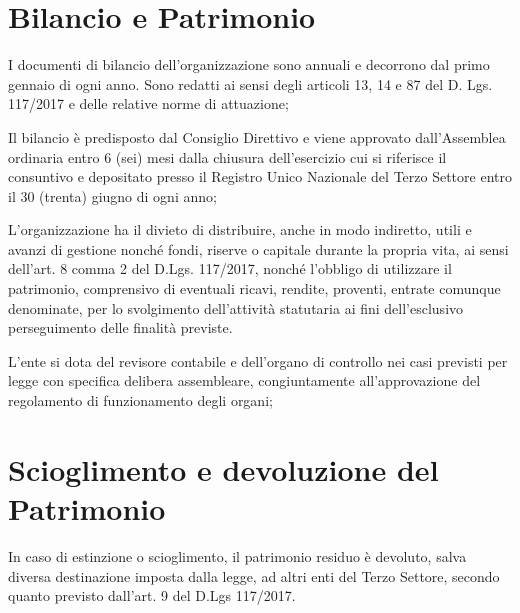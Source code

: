 \documentclass[legalpaper, 11pt]{exam}
\let\tempone\enumerate
\let\temptwo\endenumerate
\renewenvironment{enumerate}{\tempone\addtolength{\itemsep}{-0.45\baselineskip}}{\temptwo}
\begin{document}
{\section{Bilancio e Patrimonio}
\begin{enumerate}
 \item I documenti di bilancio dell’organizzazione sono annuali e decorrono dal primo gennaio di ogni anno. Sono redatti ai sensi degli articoli 13, 14 e 87 del D. Lgs. 117/2017 e delle relative norme di attuazione;
 \item Il bilancio è predisposto dal Consiglio Direttivo e viene approvato dall’Assemblea ordinaria entro 6 (sei) mesi dalla chiusura dell’esercizio cui si riferisce il consuntivo e depositato presso il Registro Unico Nazionale del Terzo Settore entro il 30 (trenta) giugno di ogni anno;
 \item L’organizzazione ha il divieto di distribuire, anche in modo indiretto, utili e avanzi di gestione nonché fondi, riserve o capitale durante la propria vita, ai sensi dell’art. 8 comma 2 del D.Lgs. 117/2017, nonché l’obbligo di utilizzare il patrimonio, comprensivo di eventuali ricavi, rendite, proventi, entrate comunque denominate, per lo svolgimento dell’attività statutaria ai fini dell’esclusivo perseguimento delle finalità previste.
 \item L’ente si dota del revisore contabile e dell’organo di controllo nei casi previsti per legge con specifica delibera assembleare, congiuntamente all’approvazione del regolamento di funzionamento degli organi;
 
\end{enumerate}

\section{Scioglimento e devoluzione del Patrimonio}
\begin{enumerate}
 \item In caso di estinzione o scioglimento, il patrimonio residuo è devoluto, salva diversa destinazione imposta dalla legge, ad altri enti del Terzo Settore, secondo quanto previsto dall’art. 9 del D.Lgs 117/2017.
\end{enumerate}

}
\end{document}
